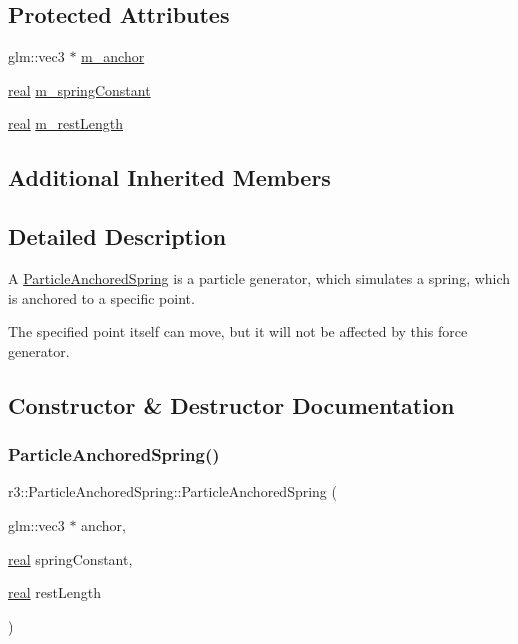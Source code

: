 \subsection*{Protected Attributes}
\begin{DoxyCompactItemize}
\item 
glm\+::vec3 $\ast$ \mbox{\hyperlink{classr3_1_1_particle_anchored_spring_a7ada060d890b9287f3cbc78f125753e7}{m\+\_\+anchor}}
\item 
\mbox{\hyperlink{namespacer3_ab2016b3e3f743fb735afce242f0dc1eb}{real}} \mbox{\hyperlink{classr3_1_1_particle_anchored_spring_a0c220ca894297faeb2ea7b97dea9c27e}{m\+\_\+spring\+Constant}}
\item 
\mbox{\hyperlink{namespacer3_ab2016b3e3f743fb735afce242f0dc1eb}{real}} \mbox{\hyperlink{classr3_1_1_particle_anchored_spring_a9440aa0062da7c4030810c3ae0006393}{m\+\_\+rest\+Length}}
\end{DoxyCompactItemize}
\subsection*{Additional Inherited Members}


\subsection{Detailed Description}
A \mbox{\hyperlink{classr3_1_1_particle_anchored_spring}{Particle\+Anchored\+Spring}} is a particle generator, which simulates a spring, which is anchored to a specific point. 

The specified point itself can move, but it will not be affected by this force generator. 

\subsection{Constructor \& Destructor Documentation}
\mbox{\label{classr3_1_1_particle_anchored_spring_adc141455ffbe50ec1595679cc3fe9753}} 
\subsubsection{\texorpdfstring{Particle\+Anchored\+Spring()}{ParticleAnchoredSpring()}}
{\footnotesize\ttfamily r3\+::\+Particle\+Anchored\+Spring\+::\+Particle\+Anchored\+Spring (\begin{DoxyParamCaption}\item[{glm\+::vec3 $\ast$}]{anchor,  }\item[{\mbox{\hyperlink{namespacer3_ab2016b3e3f743fb735afce242f0dc1eb}{real}}}]{spring\+Constant,  }\item[{\mbox{\hyperlink{namespacer3_ab2016b3e3f743fb735afce242f0dc1eb}{real}}}]{rest\+Length }\end{DoxyParamCaption})\hspace{0.3cm}{\ttfamily [explicit]}}



